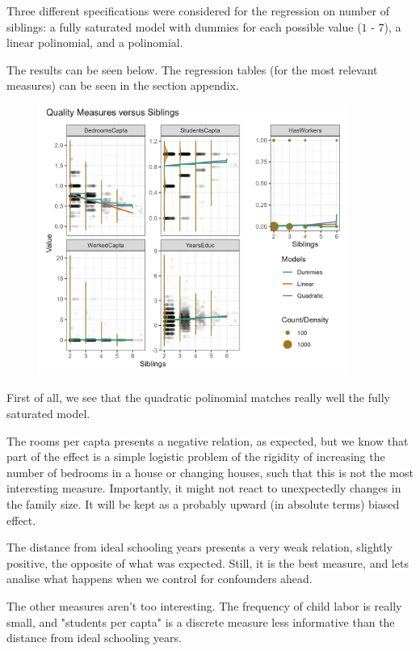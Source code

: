 \documentclass[12pt]{article}
\begin{document}
Three different specifications were considered for the regression on number of siblings: a fully saturated model with dummies for each possible value ($1$ - $7$), a linear polinomial, and a polinomial.

The results can be seen below. The regression tables (for the most relevant measures) can be seen in the section appendix.

\begin{figure}[!htbp]
    \centering
    \includegraphics[width=0.9\textwidth]{figures/quality.png}
    \label{fig:quality}
\end{figure}

First of all, we see that the quadratic polinomial matches really well the fully saturated model.

The rooms per capta presents a negative relation, as expected, but we know that part of the effect is a simple logistic problem of the rigidity of increasing the number of bedrooms in a house or changing houses, such that this is not the most interesting measure. Importantly, it might not react to unexpectedly changes in the family size. It will be kept as a probably upward (in absolute terms) biased effect.

The distance from ideal schooling years presents a very weak relation, slightly positive, the opposite of what was expected. Still, it is the best measure, and lets analise what happens when we control for confounders ahead.

The other measures aren't too interesting. The frequency of child labor is really small, and "students per capta" is a discrete measure less informative than the distance from ideal schooling years.
\end{document}
